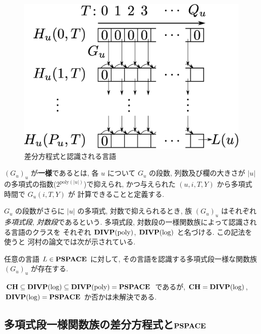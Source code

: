  \begin{figure}
  \label{fig:divp}
  \begin{center}
   \includegraphics[height=0.2\textheight]{image/divp.eps}
  \end{center}
  \caption{差分方程式と認識される言語}
 \end{figure}

$(G_u)_u$ が{\bf 一様}であるとは,
各 $u$ について $G _u$ の段数, 列数及び欄の大きさが $|u|$ の多項式の指数($2^{\mathrm{poly} (|u|)}$)で抑えられ, 
かつ与えられた $(u, i, T, Y)$ から多項式時間で $G_u(i, T, Y)$ が
計算できることと定義する.

$G_u$ の段数がさらに $|u|$ の多項式, 対数で抑えられるとき, 
族 $(G_u) _u$ はそれぞれ\emph{多項式段}, \emph{対数段}であるという. 
多項式段, 対数段の一様関数族によって認識される言語のクラスを
それぞれ $\mathbf{DIVP(\mathrm{poly})}$, $\mathbf{DIVP(\log)}$ と名づける.
この記法を使うと
河村の論文では次が示されている.

 \begin{lemma}
  \label{WeakFeedback}
  任意の言語 $L \in \mathbf{PSPACE}$ に対して,
  その言語を認識する多項式段一様な関数族 $(G_u)_u$ が存在する.
 \end{lemma}

 $\mathbf{CH} \subseteq \mathbf{DIVP(\log)} \subseteq \mathbf{DIVP(\mathrm{poly})} = \mathbf{PSPACE}$ であるが, 
 $\mathbf{CH} = \mathbf{DIVP(\log)}$, $\mathbf{DIVP(\log)} = \mathbf{PSPACE}$ か否かは未解決である.

\subsection{多項式段一様関数族の差分方程式と$\mathbf{PSPACE}$}


